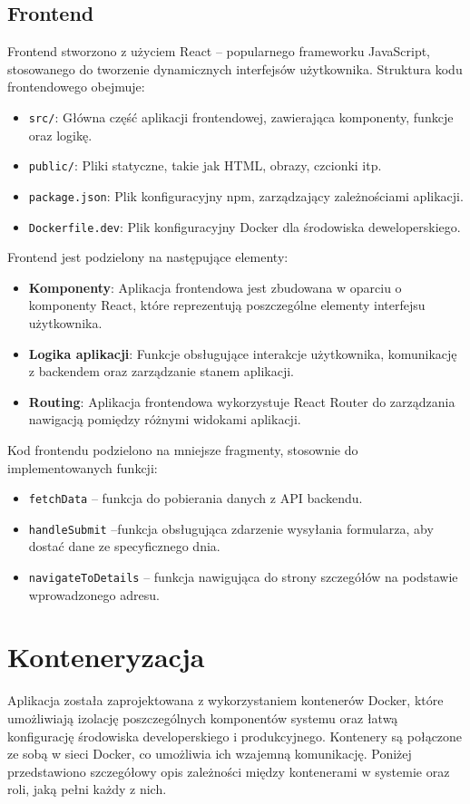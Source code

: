 \subsection{Frontend}
Frontend stworzono z użyciem React -- popularnego frameworku JavaScript, stosowanego do tworzenie dynamicznych interfejsów użytkownika. Struktura kodu frontendowego obejmuje:
\begin{itemize}
    \item \texttt{src/}: Główna część aplikacji frontendowej, zawierająca komponenty, funkcje oraz logikę.
    \item \texttt{public/}: Pliki statyczne, takie jak HTML, obrazy, czcionki itp.
    \item \texttt{package.json}: Plik konfiguracyjny npm, zarządzający zależnościami aplikacji.
    \item \texttt{Dockerfile.dev}: Plik konfiguracyjny Docker dla środowiska deweloperskiego.
\end{itemize}
Frontend jest podzielony na następujące elementy:
\begin{itemize}
    \item \textbf{Komponenty}: Aplikacja frontendowa jest zbudowana w oparciu o komponenty React, które reprezentują poszczególne elementy interfejsu użytkownika.
    \item \textbf{Logika aplikacji}: Funkcje obsługujące interakcje użytkownika, komunikację z backendem oraz zarządzanie stanem aplikacji.
    \item \textbf{Routing}: Aplikacja frontendowa wykorzystuje React Router do zarządzania nawigacją pomiędzy różnymi widokami aplikacji.
\end{itemize}


Kod frontendu podzielono na mniejsze fragmenty, stosownie do implementowanych funkcji:
\begin{itemize}
    \item \texttt{fetchData} -- funkcja do pobierania danych z API backendu.
    \item \texttt{handleSubmit} --funkcja obsługująca zdarzenie wysyłania formularza, aby dostać dane ze specyficznego dnia.
    \item \texttt{navigateToDetails} -- funkcja nawigująca do strony szczegółów na podstawie wprowadzonego adresu.
\end{itemize}




\section{Konteneryzacja}
Aplikacja została zaprojektowana z wykorzystaniem kontenerów Docker, które umożliwiają izolację poszczególnych komponentów systemu oraz łatwą konfigurację środowiska developerskiego i produkcyjnego. Kontenery są połączone ze sobą w sieci Docker, co umożliwia ich wzajemną komunikację. Poniżej przedstawiono szczegółowy opis zależności między kontenerami w systemie oraz roli, jaką pełni każdy z nich.


